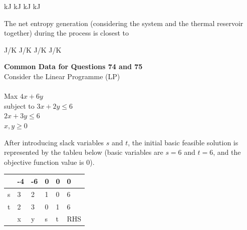 \documentclass[addpoints,11pt]{exam}
\begin{document}
\begin{questions}
    \begin{oneparchoices}
         kJ
         kJ
         kJ
         kJ
    \end{oneparchoices}

    \question The net entropy generation (considering the system and the thermal reservoir together) during the process is closest to

    \begin{oneparchoices}
         J/K
         J/K
         J/K
         J/K
    \end{oneparchoices}

\pagebreak
\normalsize\textbf{Common Data for Questions 74 and 75}\\
Consider the Linear Programme (LP)\\\\
Max $4x + 6y$\\
subject to
$3x+2y\le6$\\
$2x+3y\le6$\\
$x,y\ge0$

    \question After introducing slack variables $s$ and $t$, the initial basic feasible solution is represented by the tableu below (basic variables are $s=6$ and $t=6$, and the objective function value is 0).\\
    \begin{center}
        \begin{tabular}{|l|l|l|l|l|l|}
            \hline
            &-4&-6&0&0&0\\\hline
            s&3&2&1&0&6\\\hline
            t&2&3&0&1&6\\\hline
            &x&y&s&t&RHS\\\hline
        \end{tabular}
    \end{center}

    \begin{oneparchoices}
        \choice
        \choice
        \choice
        \choice
    \end{oneparchoices}

    \question

    \begin{oneparchoices}
        \choice
        \choice
        \choice
        \choice
    \end{oneparchoices}

    \question

    \begin{oneparchoices}
        \choice
        \choice
        \choice
        \choice
    \end{oneparchoices}

    \question

    \begin{oneparchoices}
        \choice
        \choice
        \choice
        \choice
    \end{oneparchoices}
\end{questions}
\end{document}
